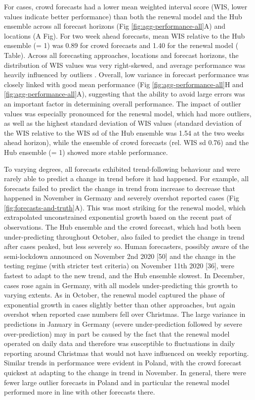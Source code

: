 \documentclass[10pt,letterpaper]{article}
\providecommand{\DIFaddtex}[1]{{\protect\color{blue}\uwave{#1}}} %
\providecommand{\DIFaddbegin}{} %
\providecommand{\DIFaddend}{} %
\providecommand{\DIFadd}[1]{\texorpdfstring{\DIFaddtex{#1}}{#1}} %
\newcommand{\DIFaddincludegraphics}[2][]{{\color{blue}\fbox{\DIFOincludegraphics[#1]{#2}}}} %
\DeclareRobustCommand{\DIFaddbegin}{\DIFOaddbegin \let\includegraphics\DIFaddincludegraphics} %
\DeclareRobustCommand{\DIFaddend}{\DIFOaddend \let\includegraphics\DIFOincludegraphics} %
\begin{document}
For cases, crowd forecasts had a lower mean weighted interval score
(WIS, lower values indicate better performance) than both the renewal
model and the Hub ensemble across all forecast horizons (Fig
\ref{fig:agg-performance-all}A) and locations
(A Fig). For two week ahead
forecasts, mean WIS relative to the Hub ensemble (= 1) was 0.89 for
crowd forecasts and 1.40 for the renewal model
( Table). Across all forecasting approaches,
locations and forecast horizons, the distribution of WIS values was very
right-skewed, and average performance was heavily influenced by outliers
\DIFaddbegin \DIFadd{(see Fig \ref{fig:distribution-scores})}\DIFaddend . Overall, low variance in
forecast performance was closely linked with good mean performance (Fig
\ref{fig:agg-performance-all}H and \ref{fig:agg-performance-all}A),
suggesting that the ability to avoid large errors was an important
factor in determining overall performance. The impact of outlier values
was especially pronounced for the renewal model, which had more
outliers, as well as the highest standard deviation of WIS values
(standard deviation of the WIS relative to the WIS sd of the Hub
ensemble was 1.54 at the two weeks ahead horizon), while the ensemble of
crowd forecasts (rel. WIS sd 0.76) and the Hub ensemble (= 1) showed
more stable performance.

To varying degrees, all forecasts exhibited trend-following behaviour
and were rarely able to predict a change in trend before it had
happened. For example, all forecasts failed to predict the change in
trend from increase to decrease that happened in November in Germany and
severely overshot reported cases (Fig \ref{fig:forecasts-and-truth}A).
This was most striking for the renewal model, which extrapolated
unconstrained exponential growth based on the recent past of
observations. The Hub ensemble and the crowd forecast, which had both
been under-predicting throughout October, also failed to predict the
change in trend after cases peaked, but less severely so. Human
forecasters, possibly aware of the semi-lockdown announced on November
2nd 2020 {[}50{]} and the change in the testing regime (with stricter
test criteria) on November 11th 2020 {[}36{]}, were fastest to adapt to
the new trend, and the Hub ensemble slowest. In December, cases rose
again in Germany, with all models under-predicting this growth to
varying extents. As in October, the renewal model captured the phase of
exponential growth in cases slightly better than other approaches, but
again overshot when reported case numbers fell over Christmas. The large
variance in predictions in January in Germany (severe under-prediction
followed by severe over-prediction) may in part be caused by the fact
that the renewal model operated on daily data and therefore was
susceptible to fluctuations in daily reporting around Christmas that
would not have influenced on weekly reporting. Similar trends in
performance were evident in Poland, with the crowd forecast quickest at
adapting to the change in trend in November. In general, there were
fewer large outlier forecasts in Poland and in particular the renewal
model performed more in line with other forecasts there.
\end{document}
